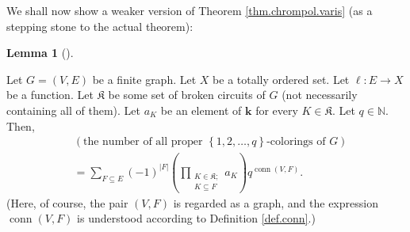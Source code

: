 \documentclass[numbers=enddot,12pt,final,onecolumn,notitlepage]{scrartcl}%
\theoremstyle{definition}
\newtheorem{lem}[theo]{Lemma}
\newenvironment{lemma}[1][]
{\begin{lem}[#1]\begin{leftbar}}
{\end{leftbar}\end{lem}}
\let\sumnonlimits\sum
\let\prodnonlimits\prod
\renewcommand{\sum}{\sumnonlimits\limits}
\renewcommand{\prod}{\prodnonlimits\limits}
\begin{document}
We shall now show a weaker version of Theorem \ref{thm.chrompol.varis} (as a
stepping stone to the actual theorem):

\begin{lemma}
\label{lem.chrompol.weak.varis}Let $G=\left(  V,E\right)  $ be a finite graph.
Let $X$ be a totally ordered set. Let $\ell:E\rightarrow X$ be a function. Let
$\mathfrak{K}$ be some set of broken circuits of $G$ (not necessarily
containing all of them). Let $a_{K}$ be an element of $\mathbf{k}$ for every
$K\in\mathfrak{K}$. Let $q\in\mathbb{N}$. Then,%
\begin{align*}
&  \left(  \text{the number of all proper }\left\{  1,2,\ldots,q\right\}
\text{-colorings of }G\right) \\
&  =\sum_{F\subseteq E}\left(  -1\right)  ^{\left\vert F\right\vert }\left(
\prod_{\substack{K\in\mathfrak{K};\\K\subseteq F}}a_{K}\right)
q^{\operatorname*{conn}\left(  V,F\right)  }.
\end{align*}
(Here, of course, the pair $\left(  V,F\right)  $ is regarded as a graph, and
the expression $\operatorname*{conn}\left(  V,F\right)  $ is understood
according to Definition \ref{def.conn}.)
\end{lemma}
\end{document}
